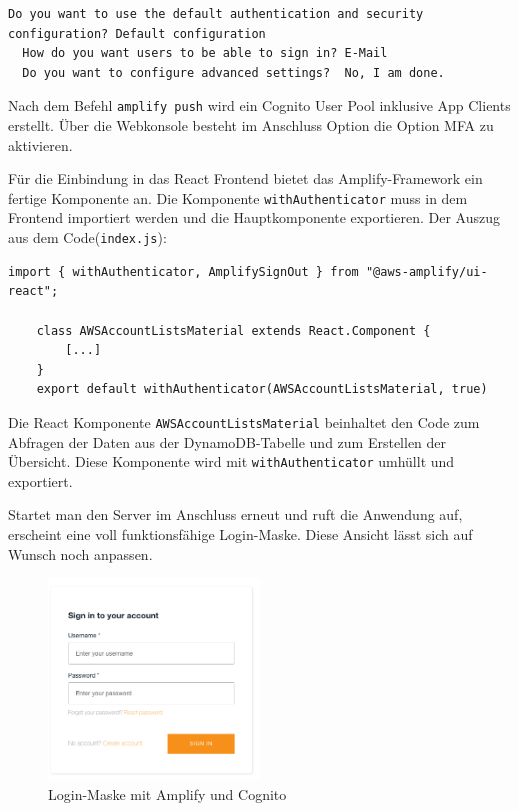 \begin{lstlisting}[basicstyle=\ttfamily\small, breaklines=true , frame = single, backgroundcolor=\color{lavender} ]
  Do you want to use the default authentication and security configuration? Default configuration
  How do you want users to be able to sign in? E-Mail
  Do you want to configure advanced settings?  No, I am done.
\end{lstlisting}

Nach dem Befehl \verb+amplify push+ wird ein Cognito User Pool inklusive App Clients erstellt.
Über die Webkonsole besteht im Anschluss Option die Option MFA zu aktivieren.

Für die Einbindung in das React Frontend bietet das Amplify-Framework ein fertige Komponente an.
Die Komponente \verb+withAuthenticator+ muss in dem Frontend importiert werden und die Hauptkomponente exportieren.\cite[]{ImpAuth}
Der Auszug aus dem Code(\verb+index.js+):


\begin{lstlisting}[basicstyle=\ttfamily\small, breaklines=true , frame = single, backgroundcolor=\color{lavender} ]
    import { withAuthenticator, AmplifySignOut } from "@aws-amplify/ui-react";

    class AWSAccountListsMaterial extends React.Component {
        [...]
    }
    export default withAuthenticator(AWSAccountListsMaterial, true)
    \end{lstlisting}

Die React Komponente \verb+AWSAccountListsMaterial+ beinhaltet den Code zum Abfragen der Daten aus der DynamoDB-Tabelle und zum Erstellen der Übersicht.
Diese Komponente wird mit \verb+withAuthenticator+ umhüllt und exportiert.

Startet man den Server im Anschluss erneut und ruft die Anwendung auf, erscheint eine voll funktionsfähige Login-Maske.
Diese Ansicht lässt sich auf Wunsch noch anpassen.

\begin{figure}[htbp]
    \centering
    \includegraphics[width=0.5\textwidth]{50-Implementierung/Login.png}
    \caption{Login-Maske mit Amplify und Cognito}
    \label{fig:meine-grafik}
\end{figure}

